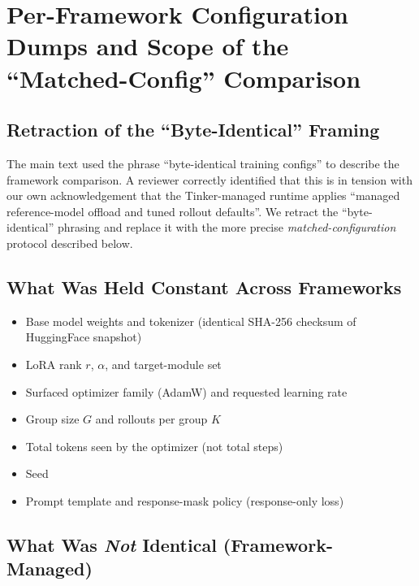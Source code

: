 \section{Per-Framework Configuration Dumps and Scope of the ``Matched-Config'' Comparison}
\label{sec:appendix:framework-configs}

\subsection{Retraction of the ``Byte-Identical'' Framing}

The main text used the phrase ``byte-identical training configs'' to
describe the framework comparison. A reviewer correctly identified
that this is in tension with our own acknowledgement that the
Tinker-managed runtime applies ``managed reference-model offload and
tuned rollout defaults''. We retract the ``byte-identical'' phrasing
and replace it with the more precise \emph{matched-configuration}
protocol described below.

\subsection{What Was Held Constant Across Frameworks}

\begin{itemize}[leftmargin=1.2em,itemsep=1pt]
  \item Base model weights and tokenizer (identical SHA-256 checksum of
        HuggingFace snapshot)
  \item LoRA rank $r$, $\alpha$, and target-module set
  \item Surfaced optimizer family (AdamW) and requested learning rate
  \item Group size $G$ and rollouts per group $K$
  \item Total tokens seen by the optimizer (not total steps)
  \item Seed
  \item Prompt template and response-mask policy (response-only loss)
\end{itemize}

\subsection{What Was \emph{Not} Identical (Framework-Managed)}

